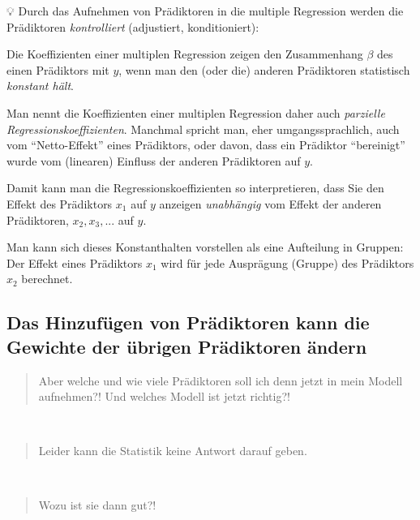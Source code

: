 \documentclass[
  a4paper,
  DIV=11]{scrreprt}
\theoremstyle{definition}
\theoremstyle{remark}
\begin{document}
💡 Durch das Aufnehmen von Prädiktoren in die multiple Regression werden
die Prädiktoren \emph{kontrolliert} (adjustiert, konditioniert):

Die Koeffizienten einer multiplen Regression zeigen den Zusammenhang
\(\beta\) des einen Prädiktors mit \(y\), wenn man den (oder die)
anderen Prädiktoren statistisch \emph{konstant hält}.

Man nennt die Koeffizienten einer multiplen Regression daher auch
\emph{parzielle Regressionskoeffizienten}. Manchmal spricht man, eher
umgangssprachlich, auch vom ``Netto-Effekt'' eines Prädiktors, oder
davon, dass ein Prädiktor ``bereinigt'' wurde vom (linearen) Einfluss
der anderen Prädiktoren auf \(y\).

Damit kann man die Regressionskoeffizienten so interpretieren, dass Sie
den Effekt des Prädiktors \(x_1\) auf \(y\) anzeigen \emph{unabhängig}
vom Effekt der anderen Prädiktoren, \(x_2,x_3,...\) auf \(y\).

Man kann sich dieses Konstanthalten vorstellen als eine Aufteilung in
Gruppen: Der Effekt eines Prädiktors \(x_1\) wird für jede Ausprägung
(Gruppe) des Prädiktors \(x_2\) berechnet.

\hypertarget{das-hinzufuxfcgen-von-pruxe4diktoren-kann-die-gewichte-der-uxfcbrigen-pruxe4diktoren-uxe4ndern}{%
\subsection{Das Hinzufügen von Prädiktoren kann die Gewichte der übrigen
Prädiktoren
ändern}\label{das-hinzufuxfcgen-von-pruxe4diktoren-kann-die-gewichte-der-uxfcbrigen-pruxe4diktoren-uxe4ndern}}

\begin{quote}
Aber welche und wie viele Prädiktoren soll ich denn jetzt in mein Modell
aufnehmen?! Und welches Modell ist jetzt richtig?!
\end{quote}

🧑

\begin{quote}
Leider kann die Statistik keine Antwort darauf geben.
\end{quote}

👩

\begin{quote}
Wozu ist sie dann gut?!
\end{quote}

🧑
\end{document}
